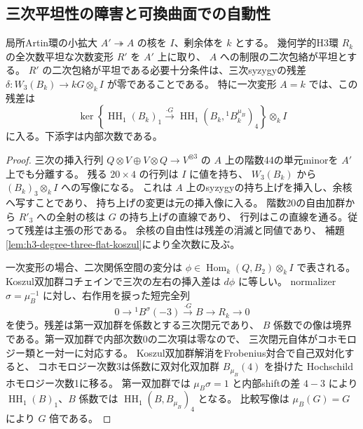 \subsection{三次平坦性の障害と可換曲面での自動性}
\begin{proposition}\label{prop:h3-cubic-flatness-small-extension}
局所Artin環の小拡大 $A'\twoheadrightarrow A$ の核を $I$、剰余体を $k$ とする。
幾何学的H3環 $R_k$ の全次数平坦な次数変形 $R'$ を $A'$ 上に取り、
$A$ への制限の二次包絡が平坦とする。
$R'$ の二次包絡が平坦である必要十分条件は、三次syzygyの残差
$\delta:W_3(B_k)\to kG\otimes_k I$ が零であることである。
特に一次変形 $A=k$ では、この残差は
\[
 \ker\left\{\operatorname{HH}_1(B_k)_1
   \xrightarrow{\cdot G}
    \operatorname{HH}_1(B_k,{}^1B_k^{\mu_B})_4\right\}\otimes_k I
\]
に入る。下添字は内部次数である。
\end{proposition}
\begin{proof}
三次の挿入行列 $Q\otimes V\oplus V\otimes Q\to V^{\otimes3}$ の
$A$ 上の階数44の単元minorを $A'$ 上でも分離する。
残る $20\times4$ の行列は $I$ に値を持ち、
$W_3(B_k)$ から $(B_k)_3\otimes_k I$ への写像になる。
これは $A$ 上のsyzygyの持ち上げを挿入し、余核へ写すことであり、
持ち上げの変更は元の挿入像に入る。
階数20の自由加群から $R'_3$ への全射の核は $G$ の持ち上げの直線であり、
行列はこの直線を通る。従って残差は主張の形である。
余核の自由性は残差の消滅と同値であり、
補題\ref{lem:h3-degree-three-flat-koszul}により全次数に及ぶ。

一次変形の場合、二次関係空間の変分は
$\phi\in\operatorname{Hom}_k(Q,B_2)\otimes_k I$ で表される。
Koszul双加群コチェインで三次の左右の挿入差は $d\phi$ に等しい。
normalizer $\sigma=\mu_B^{-1}$ に対し、右作用を捩った短完全列
\[
 0\longrightarrow {}^1B^\sigma(-3)\xrightarrow{\cdot G}
 B\longrightarrow R_k\longrightarrow0
\]
を使う。残差は第一双加群を係数とする三次閉元であり、
$B$ 係数での像は境界である。第一双加群で内部次数0の二次項は零なので、
三次閉元自体がコホモロジー類と一対一に対応する。
Koszul双加群解消をFrobenius対合で自己双対化すると、
コホモロジー次数3は係数に双対化双加群 $B_{\mu_B}(4)$ を掛けた
Hochschildホモロジー次数1に移る。
第一双加群では $\mu_B\sigma=1$ と内部shiftの差 $4-3$ により
$\operatorname{HH}_1(B)_1$、$B$ 係数では
$\operatorname{HH}_1(B,B_{\mu_B})_4$ となる。
比較写像は $\mu_B(G)=G$ により $G$ 倍である。
\end{proof}


